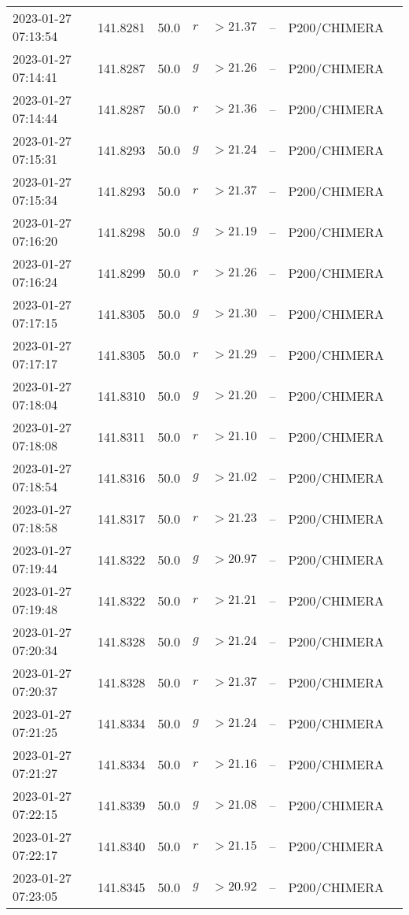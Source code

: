 \documentclass{nature_plusfigure}
\begin{document}
\begin{supplement}
\begin{center}
\begin{longtable}{llllllll}
2023-01-27 07:13:54 & 141.8281 & 50.0 & $r$ & $>21.37$ & -- & P200/CHIMERA &  \\ 
2023-01-27 07:14:41 & 141.8287 & 50.0 & $g$ & $>21.26$ & -- & P200/CHIMERA &  \\ 
2023-01-27 07:14:44 & 141.8287 & 50.0 & $r$ & $>21.36$ & -- & P200/CHIMERA &  \\ 
2023-01-27 07:15:31 & 141.8293 & 50.0 & $g$ & $>21.24$ & -- & P200/CHIMERA &  \\ 
2023-01-27 07:15:34 & 141.8293 & 50.0 & $r$ & $>21.37$ & -- & P200/CHIMERA &  \\ 
2023-01-27 07:16:20 & 141.8298 & 50.0 & $g$ & $>21.19$ & -- & P200/CHIMERA &  \\ 
2023-01-27 07:16:24 & 141.8299 & 50.0 & $r$ & $>21.26$ & -- & P200/CHIMERA &  \\ 
2023-01-27 07:17:15 & 141.8305 & 50.0 & $g$ & $>21.30$ & -- & P200/CHIMERA &  \\ 
2023-01-27 07:17:17 & 141.8305 & 50.0 & $r$ & $>21.29$ & -- & P200/CHIMERA &  \\ 
2023-01-27 07:18:04 & 141.8310 & 50.0 & $g$ & $>21.20$ & -- & P200/CHIMERA &  \\ 
2023-01-27 07:18:08 & 141.8311 & 50.0 & $r$ & $>21.10$ & -- & P200/CHIMERA &  \\ 
2023-01-27 07:18:54 & 141.8316 & 50.0 & $g$ & $>21.02$ & -- & P200/CHIMERA &  \\ 
2023-01-27 07:18:58 & 141.8317 & 50.0 & $r$ & $>21.23$ & -- & P200/CHIMERA &  \\ 
2023-01-27 07:19:44 & 141.8322 & 50.0 & $g$ & $>20.97$ & -- & P200/CHIMERA &  \\ 
2023-01-27 07:19:48 & 141.8322 & 50.0 & $r$ & $>21.21$ & -- & P200/CHIMERA &  \\ 
2023-01-27 07:20:34 & 141.8328 & 50.0 & $g$ & $>21.24$ & -- & P200/CHIMERA &  \\ 
2023-01-27 07:20:37 & 141.8328 & 50.0 & $r$ & $>21.37$ & -- & P200/CHIMERA &  \\ 
2023-01-27 07:21:25 & 141.8334 & 50.0 & $g$ & $>21.24$ & -- & P200/CHIMERA &  \\ 
2023-01-27 07:21:27 & 141.8334 & 50.0 & $r$ & $>21.16$ & -- & P200/CHIMERA &  \\ 
2023-01-27 07:22:15 & 141.8339 & 50.0 & $g$ & $>21.08$ & -- & P200/CHIMERA &  \\ 
2023-01-27 07:22:17 & 141.8340 & 50.0 & $r$ & $>21.15$ & -- & P200/CHIMERA &  \\ 
2023-01-27 07:23:05 & 141.8345 & 50.0 & $g$ & $>20.92$ & -- & P200/CHIMERA &  \\ 

\end{longtable}
\end{center}
\end{supplement}
\end{document}
